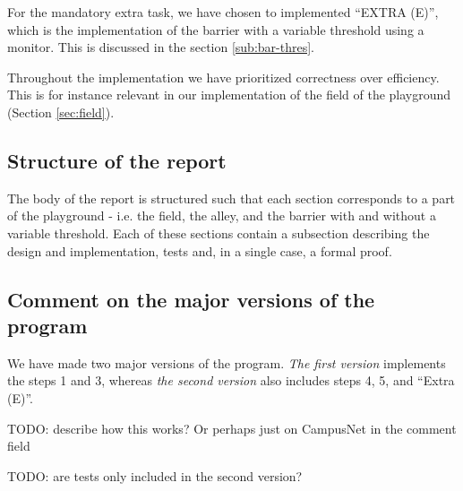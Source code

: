 For the mandatory extra task, we have chosen to implemented ``EXTRA (E)'', which is the implementation of the barrier with a variable threshold using a monitor. This is discussed in the section \ref{sub:bar-thres}.

Throughout the implementation we have prioritized correctness over efficiency. This is for instance relevant in our implementation of the field of the playground (Section \ref{sec:field}).



\subsection{Structure of the report}
The body of the report is structured such that each section corresponds to a part of the playground - i.e. the field, the alley, and the barrier with and without a variable threshold. Each of these sections contain a subsection describing the design and implementation, tests and, in a single case, a formal proof.



\subsection{Comment on the major versions of the program}
\label{sub:versions}
We have made two major versions of the program. \emph{The first version} implements the steps 1 and 3, whereas \emph{the second version} also includes steps 4, 5, and ``Extra (E)''.

TODO: describe how this works? Or perhaps just on CampusNet in the comment field

TODO: are tests only included in the second version?